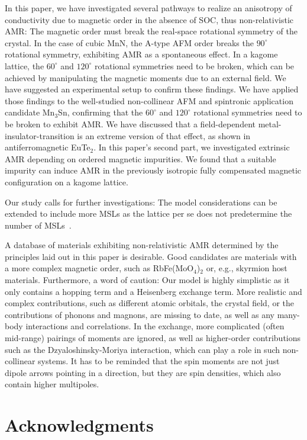 \documentclass[prb,showpacs,amsmath,amssymb,superscriptaddress,twocolumn,floatfix]{revtex4-1}
\begin{document}
In this paper, we have investigated several pathways to realize an anisotropy of conductivity due to magnetic order in the absence of SOC, thus non-relativistic AMR: The magnetic order must break the real-space rotational symmetry of the crystal. In the case of cubic MnN, the A-type AFM order breaks the $90^\circ$ rotational symmetry, exhibiting AMR as a spontaneous effect. In a kagome lattice, the $60^\circ$ and $120^\circ$ rotational symmetries need to be broken, which can be achieved by manipulating the magnetic moments due to an external field. We have suggested an experimental setup to confirm these findings. We have applied those findings to the well-studied non-collinear AFM and spintronic application candidate Mn$_3$Sn, confirming that the $60^\circ$ and $120^\circ$ rotational symmetries need to be broken to exhibit AMR. We have discussed that a field-dependent metal-insulator-transition is an extreme version of that effect, as shown in antiferromagnetic EuTe$_2$. In this paper's second part, we investigated extrinsic AMR depending on ordered magnetic impurities. We found that a suitable impurity can induce AMR in the previously isotropic fully compensated magnetic configuration on a kagome lattice.

Our study calls for further investigations: The model considerations can be extended to include more MSLs as the lattice per se does not predetermine the number of MSLs~\cite{Hayami:2020, Rusnacko:2019}.

A database of materials exhibiting non-relativistic AMR determined by the principles laid out in this paper is desirable. Good candidates are materials with a more complex magnetic order, such as RbFe(MoO$_4$)$_2$ or, e.g., skyrmion host materials. Furthermore, a word of caution: Our model is highly simplistic as it only contains a hopping term and a Heisenberg exchange term. More realistic and complex contributions, such as different atomic orbitals, the crystal field, or the contributions of phonons and magnons, are missing to date, as well as any many-body interactions and correlations. In the exchange, more complicated (often mid-range) pairings of moments are ignored, as well as higher-order contributions such as the Dzyaloshinsky-Moriya interaction, which can play a role in such non-collinear systems. It has to be reminded that the spin moments are not just dipole arrows pointing in a direction, but they are spin densities, which also contain higher multipoles.


\section*{Acknowledgments}
\end{document}
